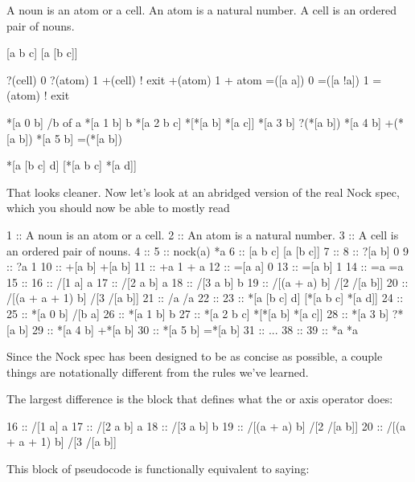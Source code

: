 \begin{code}
A noun is an atom or a cell.  
An atom is a natural number.  
A cell is an ordered pair of nouns. 
 

[a b c]              [a [b c]]

?(cell)               0
?(atom)               1
+(cell)               ! exit
+(atom)               1 + atom
=([a a])              0 
=([a !a])              1
=(atom)               ! exit


*[a 0 b]              /b of a
*[a 1 b]              b 
*[a 2 b c]            *[*[a b] *[a c]]
*[a 3 b]              ?(*[a b])
*[a 4 b]              +(*[a b])
*[a 5 b]              =(*[a b])

*[a [b c] d]          [*[a b c] *[a d]] 

\end{code}
That looks cleaner. Now let's look at an abridged version of the real Nock spec, which you should now be able to mostly read

\begin{code}
1  ::    A noun is an atom or a cell.
2  ::    An atom is a natural number.
3  ::    A cell is an ordered pair of nouns.
4  ::
5  ::    nock(a)          *a
6  ::    [a b c]          [a [b c]]
7  ::
8  ::    ?[a b]           0
9  ::    ?a               1
10 ::    +[a b]           +[a b]
11 ::    +a               1 + a
12 ::    =[a a]           0
13 ::    =[a b]           1
14 ::    =a               =a
15 ::
16 ::    /[1 a]           a
17 ::    /[2 a b]         a
18 ::    /[3 a b]         b
19 ::    /[(a + a) b]     /[2 /[a b]]
20 ::    /[(a + a + 1) b] /[3 /[a b]]
21 ::    /a               /a
22 ::
23 ::    *[a [b c] d]     [*[a b c] *[a d]]
24 ::
25 ::    *[a 0 b]         /[b a]
26 ::    *[a 1 b]         b
27 ::    *[a 2 b c]       *[*[a b] *[a c]]
28 ::    *[a 3 b]         ?*[a b]
29 ::    *[a 4 b]         +*[a b]
30 ::    *[a 5 b]         =*[a b]
31 ::
...
38 ::
39 ::    *a               *a
\end{code}

Since the Nock spec has been designed to be as concise as possible, a couple things are notationally different from the rules we've learned. 

The largest difference is the block that defines what the \kode{/} or axis operator does:

\begin{code}
16 ::    /[1 a]           a
17 ::    /[2 a b]         a
18 ::    /[3 a b]         b
19 ::    /[(a + a) b]     /[2 /[a b]]
20 ::    /[(a + a + 1) b] /[3 /[a b]]

\end{code}
This block of pseudocode is functionally equivalent to saying:

